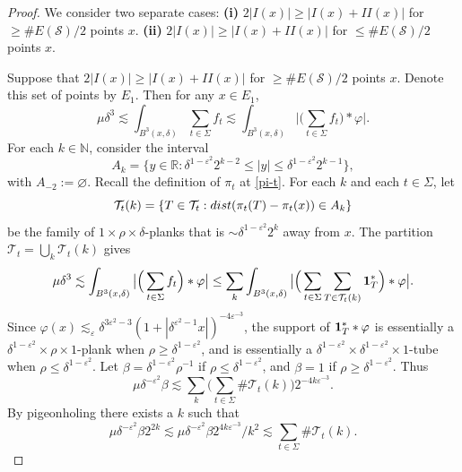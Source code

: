 \documentclass{amsart}%
\numberwithin{equation}{section}
\newcommand{\be}{\beta}
\newcommand{\de}{\delta}
\newcommand{\e}{\varepsilon}
\newcommand{\Si}{\Sigma}
\newcommand{\vp}{\varphi}
\newcommand{\cs}{\mathcal S}
\newcommand{\ZR}{\mathbb{R}}
\newcommand{\ZN}{\mathbb{N}}
\newcommand{\Id}{{\bf{1}}}
\newcommand{\cT}{{\mathcal T}}
\newcommand{\1}{\mathbbm{1}}
\newcommand{\dist}{{\rm dist}}
\begin{document}
\begin{proof}
\smallskip

We consider two separate cases: {\bf (i)} $2|I(x)|\geq|I(x)+II(x)|$ for $\geq \# E(\cs)/2$ points $x$. 
{\bf (ii)} $2|I(x)|\geq|I(x)+II(x)|$ for $\leq \# E(\cs)/2$ points $x$.

\medskip

Suppose that $2|I(x)|\geq|I(x)+II(x)|$ for $\geq \# E(\cs)/2$ points $x$. 
Denote this set of points by $E_1$. Then for any $x\in E_1$,  
\begin{equation}
    \mu\de^3\lesssim\int_{B^3(x,\de)}\sum_{t\in\Si} f_t\lesssim \int_{B^3(x,\de)}\big|\Big(\sum_{t\in\Si} f_t\Big)\ast\vp\big|.
\end{equation}
For each $k\in\ZN$, consider the interval
\begin{equation}
    A_k=\{y\in\ZR:\de^{1-\e^2}2^{k-2}\leq|y|\leq\de^{1-\e^2}2^{k-1} \},
\end{equation}
with $A_{-2}:=\varnothing$. 
Recall the definition of $\pi_t$ at \eqref{pi-t}. 
For each $k$ and each $t\in\Si$, let 
\begin{equation}
    \cT_{t}(k)=\{T\in\cT_t: \dist(\pi_t(T)-\pi_t(x))\in A_k\}
\end{equation}
be the family of $1\times\rho\times\de$-planks that is $\sim \de^{1-\e^2}2^k$ away from $x$.
The partition $\cT_t=\bigcup_k\cT_t(k)$ gives
\begin{equation}
    \mu\de^3\lesssim\int_{B^3(x,\de)}\big|\Big(\sum_{t\in\Si} f_t\Big)\ast\vp\big|\leq\sum_k\int_{B^3(x,\de)}\big|\Big(\sum_{t\in\Si} \sum_{T\in\cT_t(k)}\Id_T^\ast\Big)\ast\vp\big|.
\end{equation}
Since $\vp(x)\lesssim_\e \de^{3\e^2-3}(1+|\de^{\e^2-1}x|)^{-4\e^{-3}}$, the support of $\Id_T^\ast\ast\vp$ is essentially a $\de^{1-\e^2}\times\rho\times1$-plank when $\rho\geq\de^{1-\e^2}$, and is essentially a $\de^{1-\e^2}\times\de^{1-\e^2}\times1$-tube when $\rho\leq\de^{1-\e^2}$. 
Let $\be=\de^{1-\e^2}\rho^{-1}$ if $\rho\leq\de^{1-\e^2}$, and $\be=1$ if $\rho\geq\de^{1-\e^2}$. 
Thus 
\begin{equation}
    \mu\de^{-\e^2}\be\lesssim\sum_k\Big(\sum_{t\in\Si}\#\cT_{t}(k)\Big)2^{-4k\e^{-3}}.
\end{equation}
By pigeonholing there exists a $k$ such that
\begin{equation}
    \mu\de^{-\e^2}\beta2^{2k}\lesssim\mu\de^{-\e^2}\be2^{4k\e^{-3}}/k^2\lesssim\sum_{t\in\Si}\#\cT_{t}(k).
\end{equation}



\end{proof}
\end{document}
